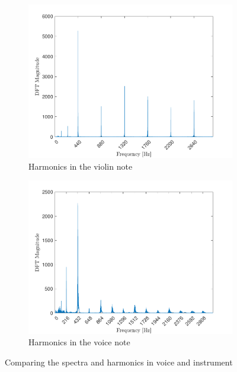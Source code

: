 \documentclass[10pt]{article}
\begin{document}
\begin{figure}[ht]
\begin{subfigure}[b]{0.48\textwidth}
        \includegraphics[width=\textwidth]{problem7_a440_violin_harmonics.pdf}
        \caption{Harmonics in the violin note}
    \end{subfigure}
    \quad
    \begin{subfigure}[b]{0.48\textwidth}
        \includegraphics[width=\textwidth]{problem7_a440_voice_harmonics.pdf}
        \caption{Harmonics in the voice note}
    \end{subfigure}
    \caption{Comparing the spectra and harmonics in voice and instrument\vspace{-0.5cm}}
    \label{note_timbre_harmonics}
\end{figure}
\end{document}
